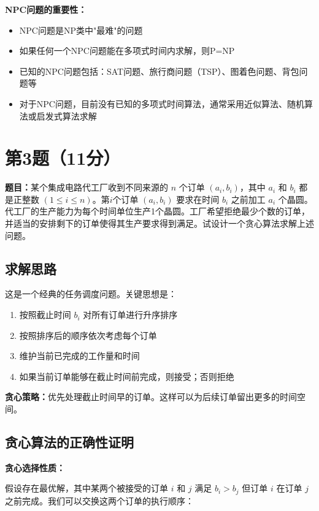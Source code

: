 \documentclass[UTF8,12pt,a4paper]{ctexart}
\begin{document}
\textbf{NPC问题的重要性：}
\begin{itemize}
	\item NPC问题是NP类中"最难"的问题
	\item 如果任何一个NPC问题能在多项式时间内求解，则P=NP
	\item 已知的NPC问题包括：SAT问题、旅行商问题（TSP）、图着色问题、背包问题等
	\item 对于NPC问题，目前没有已知的多项式时间算法，通常采用近似算法、随机算法或启发式算法求解
\end{itemize}


\section*{第3题（11分）}
\textbf{题目：}某个集成电路代工厂收到不同来源的 $n$ 个订单 $(a_{i}, b_{i})$，其中 $a_{i}$ 和 $b_{i}$ 都是正整数 $(1\leq i \leq n)$。第$i$个订单 $(a_{i}, b_{i})$ 要求在时间 $b_{i}$ 之前加工 $a_{i}$ 个晶圆。代工厂的生产能力为每个时间单位生产1个晶圆。工厂希望拒绝最少个数的订单，并适当的安排剩下的订单使得其生产要求得到满足。试设计一个贪心算法求解上述问题。

\subsection*{求解思路}

这是一个经典的任务调度问题。关键思想是：
\begin{enumerate}
	\item 按照截止时间 $b_i$ 对所有订单进行升序排序
	\item 按照排序后的顺序依次考虑每个订单
	\item 维护当前已完成的工作量和时间
	\item 如果当前订单能够在截止时间前完成，则接受；否则拒绝
\end{enumerate}

\textbf{贪心策略：}优先处理截止时间早的订单。这样可以为后续订单留出更多的时间空间。

\subsection*{贪心算法的正确性证明}

\textbf{贪心选择性质：}

假设存在最优解，其中某两个被接受的订单 $i$ 和 $j$ 满足 $b_i > b_j$ 但订单 $i$ 在订单 $j$ 之前完成。我们可以交换这两个订单的执行顺序：
\end{document}
